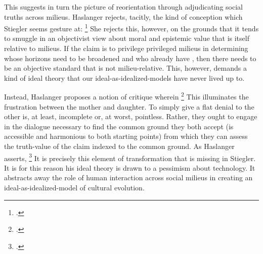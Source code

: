 \documentclass[letterpaper,notitlepage,12pt]{article}
\begin{document}
This suggests in turn the picture of reorientation through adjudicating social
truths across milieus. Haslanger rejects, tacitly, the kind of conception which
Stiegler seems gesture at: \footcite[p.
81]{haslanger_but_2007}
She rejects this, however, on the grounds that it tends to smuggle in an
objectivist view about moral and epistemic value that is itself relative to
milieus.
If the claim is to privilege privileged milieus in determining whose horizons
need to be broadened and who already have , then there
needs to be an objective standard that is not milieu-relative.
This, however, demands a kind of ideal theory that our ideal-as-idealized-models
have never lived up to.

Instead, Haslanger proposes a notion of critique wherein \footcite[p. 87]{haslanger_but_2007}
This illuminates the frustration between the mother and daughter.
To simply give a flat denial to the other is, at least, incomplete or, at worst,
pointless.
Rather, they ought to engage in the dialogue necessary to find the common ground
they both accept (is accessible and harmonious to both starting points) from
which they can assess the truth-value of the claim indexed to the common ground.
As Haslanger asserts, \footcite[p. 87]{haslanger_but_2007}
It is precisely this element of transformation that is missing in Stiegler.
It is for this reason his ideal theory is drawn to a pessimism about technology.
It abstracts away the role of human interaction across social milieus in
creating an ideal-as-idealized-model of cultural evolution.
\end{document}

